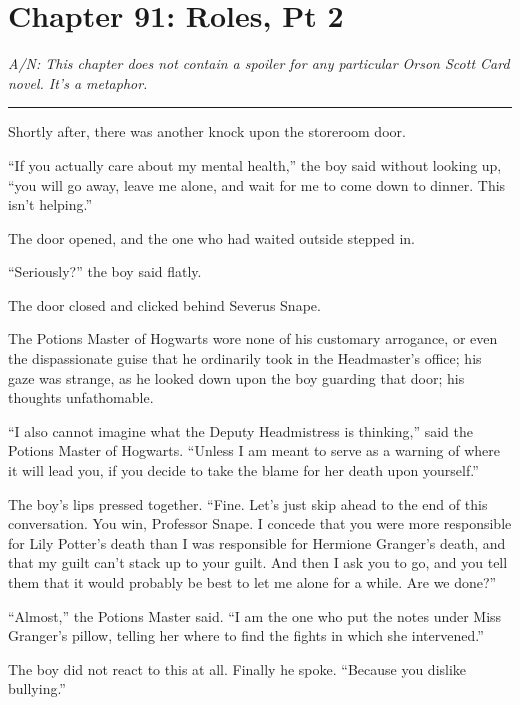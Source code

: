 \chapter{Chapter 91: Roles, Pt 2}
\emph{A/N: This chapter does not contain a spoiler for any particular Orson Scott Card novel. It's a metaphor.}

\begin{center}\rule{3in}{0.4pt}\end{center}

Shortly after, there was another knock upon the storeroom door.

``If you actually care about my mental health,'' the boy said without looking up, ``you will go away, leave me alone, and wait for me to come down to dinner. This isn't helping.''

The door opened, and the one who had waited outside stepped in.

``Seriously?'' the boy said flatly.

The door closed and clicked behind Severus Snape.

The Potions Master of Hogwarts wore none of his customary arrogance, or even the dispassionate guise that he ordinarily took in the Headmaster's office; his gaze was strange, as he looked down upon the boy guarding that door; his thoughts unfathomable.

``I also cannot imagine what the Deputy Headmistress is thinking,'' said the Potions Master of Hogwarts. ``Unless I am meant to serve as a warning of where it will lead you, if you decide to take the blame for her death upon yourself.''

The boy's lips pressed together. ``Fine. Let's just skip ahead to the end of this conversation. You win, Professor Snape. I concede that you were more responsible for Lily Potter's death than I was responsible for Hermione Granger's death, and that my guilt can't stack up to your guilt. And then I ask you to go, and you tell them that it would probably be best to let me alone for a while. Are we done?''

``Almost,'' the Potions Master said. ``I am the one who put the notes under Miss Granger's pillow, telling her where to find the fights in which she intervened.''

The boy did not react to this at all. Finally he spoke. ``Because you dislike bullying.''

